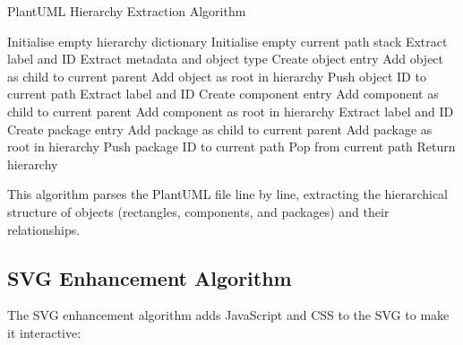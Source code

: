 \documentclass[a4paper,12pt]{article}
\begin{document}
\begin{algorithm}
\caption{PlantUML Hierarchy Extraction Algorithm}
\begin{algorithmic}[1]
    \State Initialise empty hierarchy dictionary
    \State Initialise empty current path stack
            \State Extract label and ID
            \State Extract metadata and object type
            \State Create object entry
                \State Add object as child to current parent
            \Else
                \State Add object as root in hierarchy
            \EndIf
                \State Push object ID to current path
            \EndIf
            \State Extract label and ID
            \State Create component entry
                \State Add component as child to current parent
            \Else
                \State Add component as root in hierarchy
            \EndIf
            \State Extract label and ID
            \State Create package entry
                \State Add package as child to current parent
            \Else
                \State Add package as root in hierarchy
            \EndIf
                \State Push package ID to current path
            \EndIf
            \State Pop from current path
        \EndIf
    \EndFor
    \State Return hierarchy
\EndProcedure
\end{algorithmic}
\end{algorithm}

This algorithm parses the PlantUML file line by line, extracting the hierarchical structure of objects (rectangles, components, and packages) and their relationships.

\subsection{SVG Enhancement Algorithm}

The SVG enhancement algorithm adds JavaScript and CSS to the SVG to make it interactive:
\end{document}
